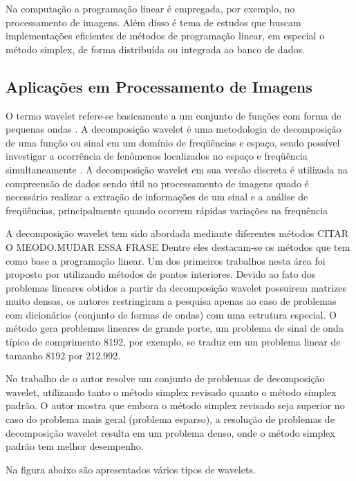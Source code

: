 Na computação a programação linear é empregada, por exemplo, no processamento de imagens. Além disso é tema de estudos que buscam implementações eficientes de métodos de programação linear, em especial o método simplex, de forma distribuída ou integrada ao banco de dados.

\subsection{Aplicações em Processamento de Imagens}
O termo wavelet refere-se basicamente a um conjunto de funções com forma de pequenas ondas \cite{Ondaletas}. A decomposição wavelet é uma metodologia de decomposição de uma função ou sinal em um domínio de freqüências e espaço, sendo possível investigar a ocorrência de fenômenos localizados no espaço e freqüência simultaneamente \cite{Peixoto-wavelet}.
A decomposição wavelet em sua versão discreta é utilizada na compreensão de dados sendo útil no processamento de imagens quado é necessário realizar a extração de informações de um sinal e a análise de freqüências, principalmente quando ocorrem rápidas variações na frequência \cite{Leite-wavelet}

A decomposição wavelet tem sido abordada mediante diferentes métodos CITAR O MEODO.MUDAR ESSA FRASE Dentre eles destacam-se os métodos que tem como base a programação linear. Um dos primeiros trabalhos nesta área foi proposto por  utilizando métodos de pontos interiores. Devido ao fato dos problemas lineares obtidos a partir da decomposição wavelet possuirem matrizes muito densas, os autores restringiram a pesquisa apenas ao caso de problemas com dicionários (conjunto de formas de ondas) com uma estrutura especial.  O método gera problemas lineares de grande porte, um problema de sinal de onda típico de comprimento 8192, por exemplo, se traduz em um problema linear de tamanho 8192 por 212.992.

No trabalho de  o autor resolve um conjunto de problemas de decomposição wavelet, utilizando tanto o método simplex revisado quanto o método simplex padrão. O autor mostra que embora o método simplex revisado seja superior no caso do problema mais geral (problema esparso), a resolução de problemas de decomposição wavelet resulta em um problema denso, onde o método simplex padrão tem melhor  desempenho.

Na figura abaixo são apresentados vários tipos de wavelets.

